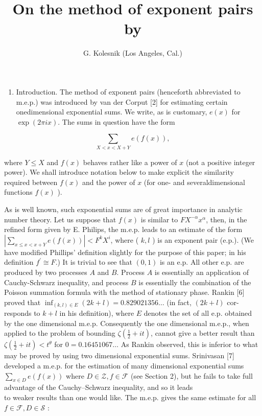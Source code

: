 \documentclass[10pt]{article}
\title{On the method of exponent pairs \\
 by }
\author{G. Kolesnik (Los Angeles, Cal.)}
\date{}
\begin{document}
\maketitle


\begin{enumerate}
  \item Introduction. The method of exponent pairs (henceforth abbreviated to m.e.p.) was introduced by van der Corput [2] for estimating certain onedimensional exponential sums. We write, as is customary, $e(x)$ for $\exp (2 \pi i x)$. The sums in question have the form
\end{enumerate}

$$
\sum_{X<x<X+Y} e(f(x)),
$$

where $Y \leqslant X$ and $f(x)$ behaves rather like a power of $x$ (not a positive integer power). We shall introduce notation below to make explicit the similarity required between $f(x)$ and the power of $x$ (for one- and severaldimensional functions $f(x)$ ).

As is well known, such exponential sums are of great importance in analytic number theory. Let us suppose that $f(x)$ is similar to $F X^{-\alpha} x^{\alpha}$, then, in the refined form given by E. Philips, the m.e.p. leads to an estimate of the form $\left|\sum_{x \leqslant x<x+Y} e(f(x))\right|<F^{k} X^{i}$, where ( $k, l$ ) is an exponent pair (e.p.). (We have modified Phillips' definition slightly for the purpose of this paper; in his definition $f^{\prime} \cong F$.) It is trivial to see that $(0,1)$ is an e.p. All other e.p. are produced by two processes $A$ and $B$. Process $A$ is essentially an application of Cauchy-Schwarz inequality, and process $B$ is essentially the combination of the Poisson summation formula with the method of stationary phase. Rankin [6] proved that $\inf _{(k, l) \in E}(2 k+l)=0.829021356 \ldots$ (in fact, $(2 k+l)$ cor- responds to $k+l$ in his definition), where $E$ denotes the set of all e.p. obtained by the one dimensional m.e.p. Consequently the one dimensional m.e.p., when applied to the problem of bounding $\zeta\left(\frac{1}{2}+i t\right)$, cannot give a better result than $\zeta\left(\frac{1}{2}+i t\right)<t^{\theta}$ for $0=0.16451067 \ldots$ As Rankin observed, this is inferior to what may be proved by using two dimensional exponential sums. Srinivasan [7] developed a m.e.p. for the estimation of many dimensional exponential sums $\sum_{x \in D} e(f(x))$ where $D \in \mathscr{Z}, f \in \mathscr{F}$ (see Section 2), but he fails to take full advantage of the Cauchy--Schwarz inequality, and so it leads\\
to weaker results than one would like. The m.e.p. gives the same estimate for all $f \in \mathscr{F}, D \in \mathscr{S}$ :
\end{document}
